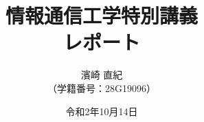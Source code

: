 \documentclass[11pt,a4paper]{jsarticle}
\title{\Huge 情報通信工学特別講義\\\huge レポート\vspace{109mm}}
\author{\Large 濱崎 直紀\\\large （学籍番号：28G19096）\vspace{23mm}}
\date{令和2年10月14日}
\begin{document}
\begin{titlepage}
\maketitle
\thispagestyle{empty}
\end{titlepage}

\pagestyle{empty}



\end{document}
